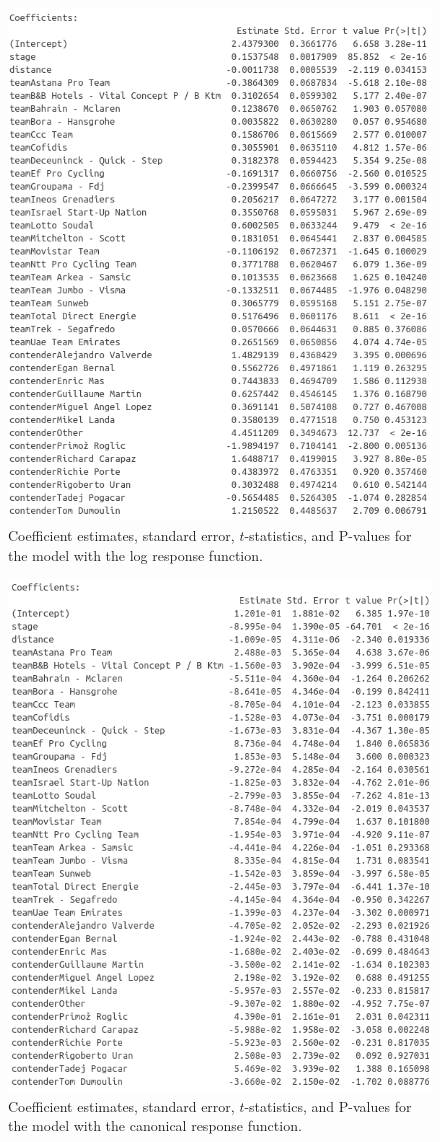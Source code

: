 \documentclass[aos,preprint]{imsart}
\begin{document}
\begin{figure}[h]
  \centering
  \includegraphics[scale=0.5]{fig/log_coefficients.png}
  \caption{Coefficient estimates, standard error, $t$-statistics, and P-values for the model with the log response function.}
  \label{fig:log_coefficients}
\end{figure}

\newpage


\begin{figure}[h]
  \centering
  \includegraphics[scale=0.5]{fig/canonical_coefficients.png}
  \caption{Coefficient estimates, standard error, $t$-statistics, and P-values for the model with the canonical response function.}
  \label{fig:canonical_coefficients}
\end{figure}
\end{document}
